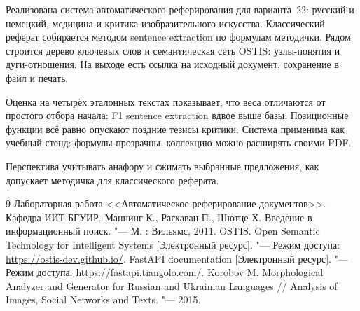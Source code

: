 
Реализована система автоматического реферирования для варианта~22: русский и немецкий, медицина и критика изобразительного искусства. Классический реферат собирается методом sentence extraction по формулам методички. Рядом строится дерево ключевых слов и семантическая сеть OSTIS: узлы-понятия и дуги-отношения. На выходе есть ссылка на исходный документ, сохранение в файл и печать.

Оценка на четырёх эталонных текстах показывает, что веса отличаются от простого отбора начала: F1 sentence extraction вдвое выше базы. Позиционные функции всё равно опускают поздние тезисы критики. Система применима как учебный стенд: формулы прозрачны, коллекцию можно расширять своими PDF.

Перспектива \mdash учитывать анафору и сжимать выбранные предложения, как допускает методичка для классического реферата.

\begin{thebibliography}{9}
	Лабораторная работа <<Автоматическое реферирование документов>>. Кафедра ИИТ БГУИР.
	Маннинг К., Рагхаван П., Шютце Х. Введение в информационный поиск. "--- М. : Вильямс, 2011.
	OSTIS. Open Semantic Technology for Intelligent Systems [Электронный ресурс]. "--- Режим доступа: \url{https://ostis-dev.github.io/}.
	FastAPI documentation [Электронный ресурс]. "--- Режим доступа: \url{https://fastapi.tiangolo.com/}.
	Korobov M. Morphological Analyzer and Generator for Russian and Ukrainian Languages // Analysis of Images, Social Networks and Texts. "--- 2015.
\end{thebibliography}
